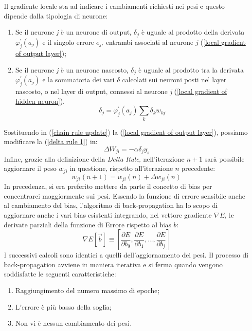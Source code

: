 Il gradiente locale sta ad indicare i cambiamenti richiesti nei pesi e questo dipende 
dalla tipologia di neurone:
\begin{enumerate}
    \item Se il neurone \emph{j} è un neurone di output, $\delta_j$ è uguale al prodotto della derivata 
    $\varphi_j^{'}(a_j)$ e il singolo errore $e_{j}$, entrambi associati al neurone $j$ (\ref{local gradient of output layer});
    \item Se il neurone \emph{j} è un neurone nascosto, $\delta_j$ è uguale al prodotto tra la derivata 
    $\varphi_j^{'}(a_j)$ e la sommatoria dei vari $\delta$ calcolati sui neuroni posti nel layer nascosto, 
    o nel layer di output, connessi al neurone \emph{j} (\ref{local gradient of hidden neuron}).
    \begin{equation}\label{local gradient of hidden neuron}
        \delta_j = \varphi_j^{'}(a_j)\sum_{k}\delta_kw_{kj}
    \end{equation}
\end{enumerate}
Sostituendo in (\ref{chain rule update}) la (\ref{local gradient of output layer}), possiamo modificare la (\ref{delta rule 1}) in:
\begin{equation}\label{delta rule 2}
    \Delta{W_{ji}} = -\alpha \delta_jy_i 
\end{equation}
Infine, grazie alla definizione della \emph{Delta Rule}, nell'iterazione $n+1$ sarà possibile 
aggiornare il peso $w_{ji}$ in questione, rispetto all'iterazione $n$ precedente:
\begin{equation}\label{weight change}
    w_{ji}(n+1) = w_{ji}(n)+\Delta{w_{ji}(n)}
\end{equation}
In precedenza, si era preferito mettere da parte il concetto di bias per concentrarci 
maggiormente sui pesi. Essendo la funzione di errore sensibile anche al cambiamento 
del bias, l'algoritmo di back-propagation ha lo scopo di aggiornare anche i 
vari bias esistenti integrando, nel vettore gradiente $\nabla{E}$, le derivate parziali della 
funzione di Errore rispetto al bias $b$:
\begin{equation}\label{gradient vector with bias}
    \nabla{E}[\vec{b}]\equiv\left[\frac{\partial E}{\partial b_{0}}, \frac{\partial E}{\partial b_{1}}, \dots, \frac{\partial E}{\partial b_{j}}\right]
\end{equation}
I successivi calcoli sono identici a quelli dell'aggiornamento dei pesi. Il processo 
di back-propagation avviene in maniera iterativa e si ferma quando vengono 
soddisfatte le seguenti caratteristiche:
\begin{enumerate}
    \item Raggiungimento del numero massimo di epoche;
    \item L'errore è più basso della soglia;
    \item Non vi è nessun cambiamento dei pesi.
\end{enumerate}

